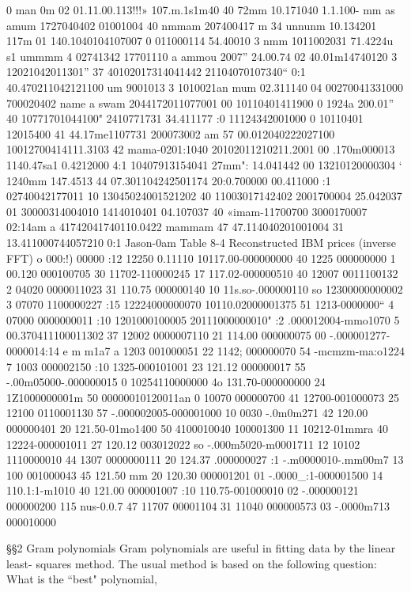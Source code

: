 0 man 0m 02 01.11.00.113!!!» 107.m.1s1m40 40 72mm 10.171040
1.1.100- mm as amum 1727040402 01001004 40 nmmam
207400417 m 34 unnunm 10.134201 117m 01 140.1040104107007
0 011000114 54.40010 3 nmm 1011002031 71.4224u s1 ummmm
4 02741342 17701110 a ammou 2007” 24.00.74 02 40.01m14740120
3 12021042011301” 37 40102017314041442 21104070107340“ 0:1 40.470211042121100
um 9001013 3 1010021an mum 02.311140 04 00270041331000
700020402 name a swam 2044172011077001 00 10110401411900
0 1924a 200.01” 40 10771701044100" 2410771731 34.411177 :0 11124342001000
0 10110401 12015400 41 44.17me1107731 200073002 am 57 00.012040222027100
10012700414111.3103 42 mama-0201:1040 20102011210211.2001 00 .170m000013
1140.47sa1 0.4212000 4:1 10407913154041 27mm": 14.041442 00 13210120000304
‘ 1240mm 147.4513 44 07.301104242501174 20:0.700000 00.411000 :1 02740042177011 10
13045024001521202 40 11003017142402 2001700004 25.042037 01 30000314004010
1414010401 04.107037 40 «imam-11700700 3000170007 02:14am a 41742041740110.0422
mammam 47 47.114040201001004 31 13.411000744057210 0:1 Jason-0am
Table 8-4 Reconstructed IBM prices (inverse FFT)
o 000:!) 00000 :12 12250 0.11110 10117.00-000000000 40 1225 000000000
1 00.120 000100705 30 11702-110000245 17 117.02-000000510 40 12007 0011100132
2 04020 0000011023 31 110.75 000000140 10 11s.so-.000000110 so 12300000000002
3 07070 1100000227 :15 12224000000070 10110.02000001375 51 1213-0000000“
4 07000 0000000011 :10 1201000100005 20111000000010" :2 .000012004-mmo1070
5 00.370411100011302 37 12002 0000007110 21 114.00 000000075 00 -.000001277-0000014:14
e m m1a7 a 1203 001000051 22 1142; 000000070 54 -mcmzm-ma:o1224
7 1003 000002150 :10 1325-000101001 23 121.12 000000017 55 -.00m05000-.000000015
0 10254110000000 4o 131.70-000000000 24 1Z1000000001m 50 00000010120011an
0 10070 000000700 41 12700-001000073 25 12100 0110001130 57 -.000002005-000001000
10 0030 -.0m0m271 42 120.00 000000401 20 121.50-01mo1400 50 4100010040 100001300
11 10212-01mmra 40 12224-000001011 27 120.12 003012022 so -.000m5020-m0001711
12 10102 1110000010 44 1307 0000000111 20 124.37 .000000027 :1 -.m0000010-.mm00m7
13 100 001000043 45 121.50 mm 20 120.30 000001201 01 -.0000_:1-000001500
14 110.1:1-m1010 40 121.00 000001007 :10 110.75-001000010 02 -.000000121 000000200
115 nus-0.0.7 47 11707 00001104 31 11040 000000573 03 -.0000m713 000010000

 

 

 

§§2 Gram polynomials
Gram polynomials are useful in ﬁtting data by the linear least-
squares method. The usual method is based on the following
question: What is the “best" polynomial,

